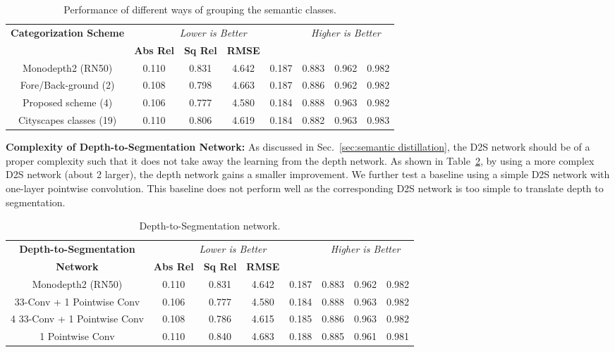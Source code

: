 \documentclass{bmvc2k}
\begin{document}
\begin{table}[h!]
\vspace{-8pt}
\centering
\scriptsize
\begin{tabular}[h]{ c  | c  c  c  c | c  c  c}
\hline
\multirow{2}{*}{\textbf{Categorization Scheme}} &\multicolumn{4}{c|}{\it Lower is Better} &\multicolumn{3}{c}{\it Higher is Better} \\
&{\bf Abs Rel} &{\bf Sq Rel} &{\bf RMSE} &{\bf } &{\bf} &{\bf} &{\bf} \\
\hline
Monodepth2 (RN50)              &0.110 &0.831 &4.642 &0.187 &0.883 &0.962 &0.982 \\
\hdashline
Fore/Back-ground (2)       &0.108 &0.798 &4.663 &0.187 &0.886 &0.962 &0.982 \\
Proposed scheme (4)    &0.106 &0.777 &4.580 &0.184 &0.888 &0.963 &0.982 \\
Cityscapes classes (19) &0.110 &0.806 &4.619 &0.184 &0.882 &0.963 &0.983 \\
\hline
\end{tabular}
\vspace{3pt}
\caption{\small Performance of different ways of grouping the semantic classes. }
\label{tab:as_grouping}
\vspace{-7pt}
\end{table}


\noindent \textbf{Complexity of Depth-to-Segmentation Network:}
As discussed in Sec.~\ref{sec:semantic distillation}, the D2S network should be of a proper complexity such that it does not take away the learning from the depth network. As shown in Table~\ref{tab:as_d2s}, by using a more complex D2S network (about 2 larger), the depth network gains a smaller improvement. We further test a baseline using a simple D2S network with one-layer pointwise convolution. This baseline does not perform well as the corresponding D2S network is too simple to translate depth to segmentation.

\begin{table}[h!]
\vspace{-0pt}
\centering
\scriptsize
\begin{tabular}[h]{ c | c  c  c  c | c  c  c}
\hline
{\textbf{Depth-to-Segmentation}}  &\multicolumn{4}{c|}{\it Lower is Better} &\multicolumn{3}{c}{\it Higher is Better} \\
{\textbf{Network}} &{\bf Abs Rel} &{\bf Sq Rel} &{\bf RMSE} &{\bf } &{\bf} &{\bf} &{\bf} \\
\hline
Monodepth2 (RN50)     &0.110 &0.831 &4.642 &0.187 &0.883 &0.962 &0.982 \\
\hdashline
2 33-Conv + 1 Pointwise Conv  &0.106 &0.777 &4.580 &0.184 &0.888 &0.963 &0.982 \\
4 33-Conv + 1 Pointwise Conv  &0.108 &0.786 &4.615 &0.185 &0.886 &0.963 &0.982 \\
1 Pointwise Conv  &0.110 &0.840 &4.683 &0.188 &0.885 &0.961 &0.981 \\
\hline
\end{tabular}
\vspace{3pt}
\caption{\small Depth-to-Segmentation network.}
\label{tab:as_d2s}
\vspace{-12pt}
\end{table}
\end{document}
